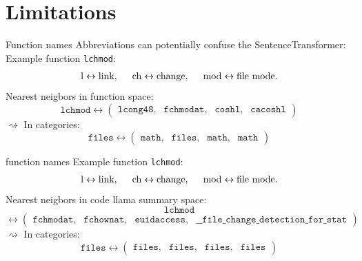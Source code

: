 \documentclass[aspectratio=1610,12pt]{beamer}
\begin{document}
\section{Limitations}
\begin{frame}{Function names}
  Abbreviations can potentially confuse the SentenceTransformer: \\
  Example function \texttt{lchmod}:
  \begin{align*}
    \text{l} \leftrightarrow \text{link}, \hspace{0.5cm}
    \text{ch} \leftrightarrow \text{change},\hspace{0.5cm}
    \text{mod} \leftrightarrow \text{file mode}.
  \end{align*}
  Nearest neigbors in function space: 
    \[  
      \texttt{lchmod} \leftrightarrow 
      \begin{pmatrix}
        \texttt{lcong48},& \texttt{fchmodat}, &
        \texttt{coshl}, & \texttt{cacoshl} 
      \end{pmatrix}
    \]
  $\rightsquigarrow$ In categories:
    \[  
      \texttt{files} \leftrightarrow 
      \begin{pmatrix}
        \texttt{math},& \texttt{files}, &
        \texttt{math}, & \texttt{math} 
      \end{pmatrix}
    \]
\end{frame}

\begin{frame}{function names}
  Example function \texttt{lchmod}:
  \begin{align*}
    \text{l} \leftrightarrow \text{link}, \hspace{0.5cm}
    \text{ch} \leftrightarrow \text{change},\hspace{0.5cm}
    \text{mod} \leftrightarrow \text{file mode}.
  \end{align*}
  Nearest neigbors in code llama summary space: 
  \[
    \texttt{lchmod}
  \]
    \[  
       \leftrightarrow 
      \begin{pmatrix}
        \texttt{fchmodat},& \texttt{fchownat}, &
        \texttt{euidaccess}, & \texttt{\_\_file\_change\_detection\_for\_stat} 
      \end{pmatrix}
    \]
  $\rightsquigarrow$ In categories:
    \[  
      \texttt{files} \leftrightarrow 
      \begin{pmatrix}
        \texttt{files},& \texttt{files}, &
        \texttt{files}, & \texttt{files} 
      \end{pmatrix}
    \]
\end{frame}
\end{document}
